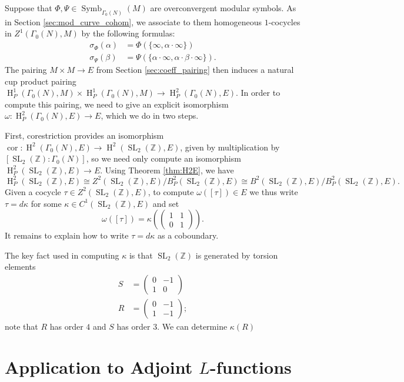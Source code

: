 \documentclass[10pt]{amsart}
\theoremstyle{plain}
\theoremstyle{definition}
\newcommand{\ZZ}{{\mathbb{Z}}}
\DeclareMathOperator{\SL}{SL}
\DeclareMathOperator{\Symb}{Symb}
\DeclareMathOperator{\Hh}{H}
\DeclareMathOperator{\cor}{cor}
\begin{document}
Suppose that $\Phi, \Psi \in \Symb_{\Gamma_0(N)}(M)$ are overconvergent modular symbols.  As in Section \ref{sec:mod_curve_cohom}, we associate to them homogeneous $1$-cocycles in $Z^1(\Gamma_0(N), M)$ by the following formulas:
\begin{align*}
\sigma_{\Phi}(\alpha) &= \Phi(\{\infty, \alpha \cdot \infty\}) \\
\sigma_{\Psi}(\beta) &= \Psi(\{\alpha \cdot \infty, \alpha \cdot \beta \cdot \infty\}).
\end{align*}
The pairing $M \times M \to E$ from Section \ref{sec:coeff_pairing} then induces a natural cup product pairing $\Hh^1_P(\Gamma_0(N), M) \times \Hh^1_P(\Gamma_0(N), M) \to \Hh^2_P(\Gamma_0(N), E)$.  In order to compute this pairing, we need to give an explicit isomorphism $\omega : \Hh^2_P(\Gamma_0(N), E) \to E$, which we do in two steps.

First, corestriction provides an isomorphism $\cor : \Hh^2(\Gamma_0(N), E) \to \Hh^2(\SL_2(\ZZ), E)$, given by multiplication by $[\SL_2(\ZZ) : \Gamma_0(N)]$,  so we need only compute an isomorphism $\Hh^2_P(\SL_2(\ZZ), E) \to E$.  Using Theorem \ref{thm:H2E}, we have
\[
\Hh^2_P(\SL_2(\ZZ), E) \cong Z^2(\SL_2(\ZZ), E) / B^2_P(\SL_2(\ZZ), E) \cong B^2(\SL_2(\ZZ), E) / B^2_P(\SL_2(\ZZ), E).
\]
Given a cocycle $\tau \in Z^2(\SL_2(\ZZ), E)$, to compute $\omega([\tau]) \in E$ we thus write $\tau = d\kappa$ for some $\kappa \in C^1(\SL_2(\ZZ), E)$ and set
\[
\omega([\tau]) = \kappa\left( \begin{pmatrix} 1 & 1 \\ 0 & 1 \end{pmatrix}\right).
\]
It remains to explain how to write $\tau = d\kappa$ as a coboundary.

The key fact used in computing $\kappa$ is that $\SL_2(\ZZ)$ is generated by torsion elements
\begin{align*}
S &= \begin{pmatrix} 0 & -1 \\ 1 & 0 \end{pmatrix} \\
R &= \begin{pmatrix} 0 & -1 \\ 1 & -1 \end{pmatrix};
\end{align*}
note that $R$ has order $4$ and $S$ has order $3$.  We can determine $\kappa(R)$

\section{Application to Adjoint $L$-functions} \label{sec:adjoint}
\end{document}
